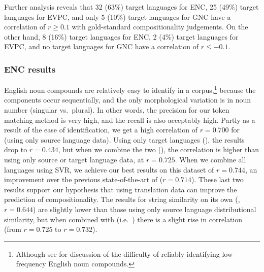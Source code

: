\documentclass[output=paper
,modfonts
,nonflat]{langsci/langscibook}
\begin{document}
Further analysis reveals that 32 (63\%) target languages for ENC, 25
(49\%) target languages for EVPC, and only 5 (10\%) target languages for
GNC have a correlation of $r \ge 0.1$ with gold-standard
compositionality judgements. On the other hand, 8 (16\%) target
languages for ENC, 2 (4\%) target languages for EVPC, and no target
languages for GNC have a correlation of $r \le -0.1$.

\subsubsection{ENC results}

English noun compounds are relatively easy to identify in a
corpus,\footnote{Although see \citet{Lapata:2003} for discussion of
  the difficulty of reliably identifying low-frequency English noun
  compounds.} because the components occur sequentially, and the only
morphological variation is in noun number (singular vs.\ plural). In
other words, the precision for our token matching method is very high,
and the recall is also acceptably high. Partly as a result of the ease
of identification, we get a high correlation of $r = 0.700$ for
\CSsource (using only source language data). Using only target
languages (\CStarg), the results drop to $r = 0.434$, but when we
combine the two (\CSsourcetarg), the correlation is higher than using
only source or target language data, at $r = 0.725$. When we combine
all languages using SVR, we achieve our best results on this dataset
of $r = 0.744$, an improvement over the previous state-of-the-art of
\citet{reddy2011a} ($r = 0.714$). These last two results support our
hypothesis that using translation data can improve the prediction of
compositionality. The results for string similarity on its own
(\CSstring, $r = 0.644$) are slightly lower than those using only
source language distributional similarity, but when combined with
\CSsourcetarg (i.e.\ \CSall) there is a slight rise in correlation
(from $r = 0.725$ to $r = 0.732$).



\end{document}
